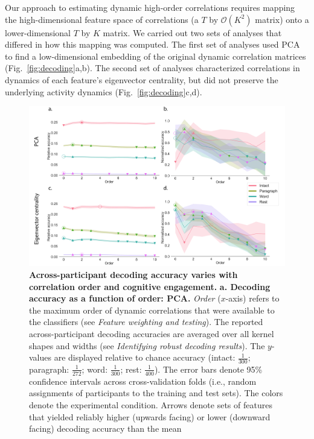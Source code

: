 \documentclass[english]{article}
\begin{document}
Our approach to estimating dynamic high-order correlations requires
mapping the high-dimensional feature space of correlations (a $T$ by
$\mathcal{O}(K^2)$ matrix) onto a lower-dimensional $T$ by $K$ matrix.
We carried out two sets of analyses that differed in how this mapping
was computed.  The first set of analyses used PCA to find a
low-dimensional embedding of the original dynamic correlation matrices
(Fig.~\ref{fig:decoding}a,b).  The second set of analyses
characterized correlations in dynamics of each feature's eigenvector
centrality, but did not preserve the underlying activity dynamics
(Fig.~\ref{fig:decoding}c,d).

\begin{figure}[hp]
  \centering
  \includegraphics[width=\textwidth]{figs/decode_level}
  \caption{\textbf{Across-participant decoding accuracy varies with
      correlation order and cognitive engagement.}
    \textbf{a. Decoding accuracy as a function of order: PCA.}
    \textit{Order} ($x$-axis) refers to the maximum order of dynamic
    correlations that were available to the classifiers (see
    \textit{Feature weighting and testing}).  The reported
    across-participant decoding accuracies are averaged over all
    kernel shapes and widths (see \textit{Identifying robust decoding
      results}).  The $y$-values are displayed relative to chance
    accuracy (intact: $\frac{1}{300}$; paragraph: $\frac{1}{272}$;
    word: $\frac{1}{300}$; rest: $\frac{1}{400}$).  The error bars
    denote 95\% confidence intervals across cross-validation folds
    (i.e., random assignments of participants to the training and test
    sets).  The colors denote the experimental condition.  Arrows
    denote sets of features that yielded reliably higher (upwards
    facing) or lower (downward facing) decoding accuracy than the mean
}
\end{figure}
\end{document}
